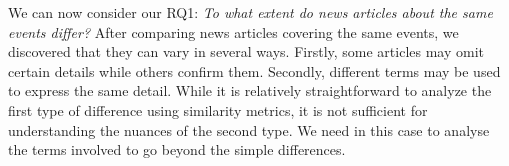We can now consider our RQ1: \emph{To what extent do news articles about the same events differ?}
After comparing news articles covering the same events, we discovered that they can vary in several ways. Firstly, some articles may omit certain details while others confirm them. Secondly, different terms may be used to express the same detail. While it is relatively straightforward to analyze the first type of difference using similarity metrics, it is not sufficient for understanding the nuances of the second type. We need in this case to analyse the terms involved to go beyond the simple differences.






